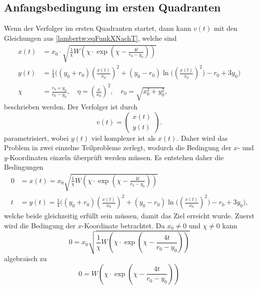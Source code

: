 \subsection{Anfangsbedingung im ersten Quadranten}
%
Wenn der Verfolger im ersten Quadranten startet, dann kann $v(t)$ mit den Gleichungen aus \eqref{lambertw:eqFunkXNachT}, welche sind
\begin{align}
    x\left(t\right)
    &=
    x_0\cdot\sqrt{\frac{1}{\chi}W\left(\chi\cdot \exp\left( \chi-\frac{4t}{r_0-y_0}\right) \right)} \\
    y(t)
    &=
    \frac{1}{4}\biggl(\left(y_0+r_0\right)\left(\frac{x(t)}{x_0}\right)^2+\left(y_0-r_0\right)\operatorname{ln}\biggl(\left(\frac{x(t)}{x_0}\right)^2\biggr)-r_0+3y_0\biggr)\\
    \chi
    &=
    \frac{r_0+y_0}{r_0-y_0}, \quad
    \eta
    =
    \left(\frac{x}{x_0}\right)^2,\quad
    r_0
    =
    \sqrt{x_0^2+y_0^2}
    \text{,}
\end{align}
%
beschrieben werden.
Der Verfolger ist durch
\begin{equation}
    v(t)
    =
    \left( \begin{array}{c} x(t) \\ y(t) \end{array} \right)
    \text{.}
\end{equation}
%
parametrisiert, wobei $y(t)$ viel komplexer ist als $x(t)$.
Daher wird das Problem in zwei einzelne Teilprobleme zerlegt, wodurch die Bedingung der $x$- und $y$-Koordinaten einzeln überprüft werden müssen. Es entstehen daher die Bedingungen
%
\begin{align}
    0
    &=
    x(t)
    =
    x_0\sqrt{\frac{1}{\chi}W\left(\chi\cdot \exp\left( \chi-\frac{4t}{r_0-y_0}\right)\right)}
    \\
    t
    &=
    y(t)
    =
    \frac{1}{4}\biggl(\left(y_0+r_0\right)\left(\frac{x(t)}{x_0}\right)^2+\left(y_0-r_0\right)\operatorname{ln}\biggl(\left(\frac{x(t)}{x_0}\right)^2\biggr)-r_0+3y_0\biggr)
    \text{,}
\end{align}
%
welche beide gleichzeitig erfüllt sein müssen, damit das Ziel erreicht wurde.
Zuerst wird die Bedingung der $x$-Koordinate betrachtet.
Da $x_0 \neq 0$ und $\chi \neq 0$ kann
\begin{equation}
    0
    =
    x_0\sqrt{\frac{1}{\chi}W\left(\chi\cdot \exp\left( \chi-\frac{4t}{r_0-y_0}\right)\right)}
\end{equation}
algebraisch zu
\begin{equation}
    0
    =
    W\left(\chi\cdot \exp\left( \chi-\frac{4t}{r_0-y_0}\right)\right)
\end{equation}
